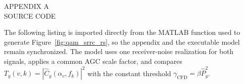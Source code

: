 \newpage
{}

\begin{center}
  APPENDIX A\\
  SOURCE CODE  
\end{center}
\bigskip

The following listing is imported directly from the MATLAB function used to generate
Figure~\ref{fig:qam_srrc_rs}, so the appendix and the executable model remain
synchronized.  The model uses one receiver-noise realization for both signals,
applies a common AGC scale factor, and compares
$T_y(v,k)=|\widehat{C}_{y}(\alpha_v,f_k)|^2$ with the constant
threshold $\gamma_{\mathrm{CFD}}=\beta\widehat{P}_{y}^{2}$.

\begin{singlespace}

\end{singlespace}
